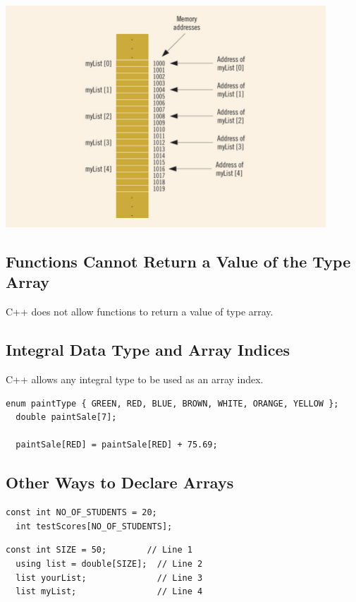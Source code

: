 \documentclass{article}
\begin{document}
\begin{center}
  \includegraphics[width=0.9\textwidth]{arr-addy-com-mem.png}
\end{center}

\subsection{Functions Cannot Return a Value of the Type Array}
C++ does not allow functions to return a value of type array.

\subsection{Integral Data Type and Array Indices}
C++ allows any integral type to be used as an array index.

\begin{lstlisting}[caption={Improved Code Readability}]
  enum paintType { GREEN, RED, BLUE, BROWN, WHITE, ORANGE, YELLOW };
  double paintSale[7];

  paintSale[RED] = paintSale[RED] + 75.69;
\end{lstlisting}

\subsection{Other Ways to Declare Arrays}

\begin{lstlisting}[caption={Declaration Using Existing Variable}]
  const int NO_OF_STUDENTS = 20;
  int testScores[NO_OF_STUDENTS];
\end{lstlisting}

\begin{lstlisting}[caption={Declaration with \texttt{using}}]
  const int SIZE = 50;        // Line 1
  using list = double[SIZE];  // Line 2
  list yourList;              // Line 3
  list myList;                // Line 4
\end{lstlisting}
\end{document}
